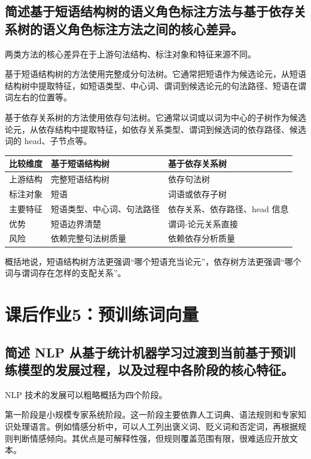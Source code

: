 \subsection{简述基于短语结构树的语义角色标注方法与基于依存关系树的语义角色标注方法之间的核心差异。}

两类方法的核心差异在于上游句法结构、标注对象和特征来源不同。

基于短语结构树的方法使用完整成分句法树。它通常把短语作为候选论元，从短语结构树中提取特征，如短语类型、中心词、谓词到候选论元的句法路径、短语在谓词左右的位置等。

基于依存关系树的方法使用依存句法树。它通常以词或以词为中心的子树作为候选论元，从依存结构中提取特征，如依存关系类型、谓词到候选词的依存路径、候选词的 head、子节点等。

\begin{table}[H]
\centering
\small
\begin{tabular}{|l|l|l|}
\hline
比较维度 & 基于短语结构树 & 基于依存关系树 \\ \hline
上游结构 & 完整短语结构树 & 依存句法树 \\ \hline
标注对象 & 短语 & 词语或依存子树 \\ \hline
主要特征 & 短语类型、中心词、句法路径 & 依存关系、依存路径、head 信息 \\ \hline
优势 & 短语边界清楚 & 谓词-论元关系直接 \\ \hline
风险 & 依赖完整句法树质量 & 依赖依存分析质量 \\ \hline
\end{tabular}
\end{table}

概括地说，短语结构树方法更强调“哪个短语充当论元”，依存树方法更强调“哪个词与谓词存在怎样的支配关系”。

\section{课后作业5：预训练词向量}

\subsection{简述 NLP 从基于统计机器学习过渡到当前基于预训练模型的发展过程，以及过程中各阶段的核心特征。}

NLP 技术的发展可以粗略概括为四个阶段。

第一阶段是小规模专家系统阶段。这一阶段主要依靠人工词典、语法规则和专家知识处理语言。例如情感分析中，可以人工列出褒义词、贬义词和否定词，再根据规则判断情感倾向。其优点是可解释性强，但规则覆盖范围有限，很难适应开放文本。

